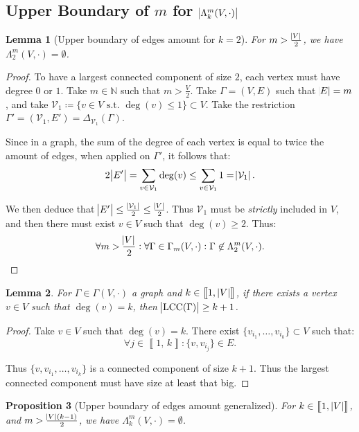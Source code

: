 \documentclass{article}
\newtheorem{lemma}{Lemma}[section]
\newtheorem{proposition}[lemma]{Proposition}
\theoremstyle{definition}
\theoremstyle{remark}
\DeclareMathOperator{\LCC}{LCC}
\newcommand{\N}{\mathbb N}
\newcommand{\intint}[2]{\left\llbracket#1, \, #2\right\rrbracket}
\newcommand{\st}{\text{ s.t. }}
\begin{document}
	\subsection{Upper Boundary of $m$ for $\abs {\Lambda_k^m(V, \cdot)}$}
		\begin{lemma}[Upper boundary of edges amount for $k=2$]\label{lemma:upper boundary k=2} For $m > \frac {\abs V}2$, we have $\Lambda_2^m(V, \cdot) = \emptyset$.
		\end{lemma}

		\begin{proof} To have a largest connected component of size $2$, each vertex must have degree $0$ or $1$. Take $m \in \N$ such that $m > \frac V2$. Take
		$\Gamma = (V, E)$ such that $\abs E = m$, and take $\mathcal V_1 \coloneqq \{v \in V \st \deg(v) \leq 1\} \subset V$. Take the restriction
		$\Gamma' = (\mathcal V_1, E') = \Delta_{\mathcal V_1}(\Gamma)$.

		Since in a graph, the sum of the degree of each vertex is equal to twice the amount of edges, when applied on $\Gamma'$, it follows that:
		\[2\abs {E'} = \sum_{v \in \mathcal V_1}\deg(v) \leq \sum_{v \in \mathcal V_1}1 = \abs {\mathcal V_1}.\]

		We then deduce that $\abs {E'} \leq \frac {\abs {\mathcal V_1}}2 \leq \frac {\abs V}2$. Thus $\mathcal V_1$ must be \textit{strictly} included in $V$,
		and then there must exist $v \in V$ such that $\deg(v) \geq 2$. Thus:
		\[\forall m > \frac {\abs V}2 : \forall \Gamma \in \Gamma_m(V, \cdot) : \Gamma \not \in \Lambda_2^m(V, \cdot).\]
		\end{proof}

		\begin{lemma} For $\Gamma \in \Gamma(V, \cdot)$ a graph and $k \in \intint 1{\abs V}$, if there exists a vertex $v \in V$ such that $\deg(v) = k$,
		then $\abs {\LCC(\Gamma)} \geq k+1$.
		\end{lemma}

		\begin{proof} Take $v \in V$ such that $\deg(v) = k$. There exist $\{v_{i_1}, \ldots, v_{i_k}\} \subset V$ such that:
		\[\forall j \in \intint 1k : \{v, v_{i_j}\} \in E.\]

		Thus $\{v, v_{i_1}, \ldots, v_{i_k}\}$ is a connected component of size $k+1$. Thus the largest connected component must have size at least that big.
		\end{proof}

		\begin{proposition}[Upper boundary of edges amount generalized] For $k \in \intint 1{\abs V}$, and $m > \frac {\abs V(k-1)}2$, we have $\Lambda_k^m(V, \cdot) = \emptyset$.
		\end{proposition}
\end{document}
